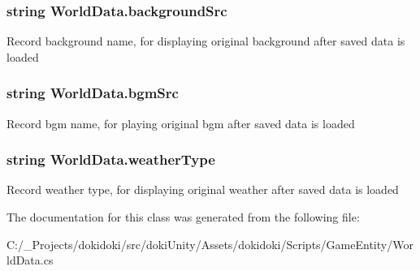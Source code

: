\subsubsection[{\texorpdfstring{background\+Src}{backgroundSrc}}]{\setlength{\rightskip}{0pt plus 5cm}string World\+Data.\+background\+Src}\hypertarget{class_world_data_ac9d2cd2f96b4eba97c7998cf62d7a1ac}{}\label{class_world_data_ac9d2cd2f96b4eba97c7998cf62d7a1ac}


Record background name, for displaying original background after saved data is loaded 

\subsubsection[{\texorpdfstring{bgm\+Src}{bgmSrc}}]{\setlength{\rightskip}{0pt plus 5cm}string World\+Data.\+bgm\+Src}\hypertarget{class_world_data_a6ec40e24b37d400f3946ed7a8c21ebbf}{}\label{class_world_data_a6ec40e24b37d400f3946ed7a8c21ebbf}


Record bgm name, for playing original bgm after saved data is loaded 

\subsubsection[{\texorpdfstring{weather\+Type}{weatherType}}]{\setlength{\rightskip}{0pt plus 5cm}string World\+Data.\+weather\+Type}\hypertarget{class_world_data_a5cdbd4ffc9bddc4978309c0e12eed7af}{}\label{class_world_data_a5cdbd4ffc9bddc4978309c0e12eed7af}


Record weather type, for displaying original weather after saved data is loaded 



The documentation for this class was generated from the following file\+:\begin{DoxyCompactItemize}
\item 
C\+:/\+\_\+\+Projects/dokidoki/src/doki\+Unity/\+Assets/dokidoki/\+Scripts/\+Game\+Entity/World\+Data.\+cs\end{DoxyCompactItemize}

